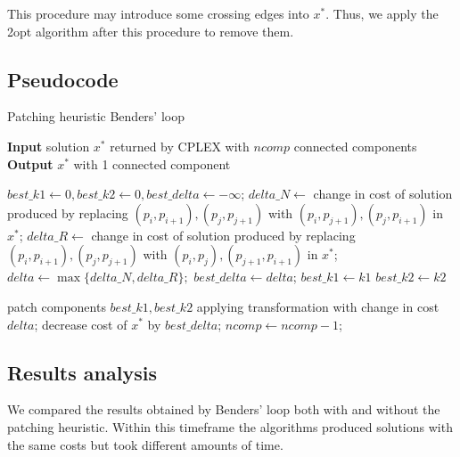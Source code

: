 This procedure may introduce some crossing edges into $x^*$. Thus, we apply the 2opt algorithm after this procedure to remove them.

\newpage
\subsection{Pseudocode}
\begin{algorithm}[h]
    \caption{Patching heuristic Benders' loop}
    \hspace*{\algorithmicindent} \textbf{Input} solution $x^*$ returned by CPLEX with $ncomp$ connected components\\
    \hspace*{\algorithmicindent} \textbf{Output} $x^*$ with 1 connected component\\
    \begin{algorithmic}

        \State $best\_k1\gets0, best\_k2\gets0, best\_delta\gets-\infty$;
        \State $delta\_N\gets$ change in cost of solution produced by replacing
        \State $(p_i,p_{i+1}), (p_j,p_{j+1})$ with $(p_i,p_{j+1}), (p_j,p_{i+1})$ in $x^*$;
        \State $delta\_R\gets$ change in cost of solution produced by replacing
        \State $(p_i,p_{i+1}), (p_j,p_{j+1})$ with $(p_i,p_j), (p_{j+1},p_{i+1})$ in $x^*$;
        \State $delta\gets\max\{delta\_N,delta\_R\};$
        \State $best\_delta \gets delta$;
        \State $best\_k1\gets k1$
        \State $best\_k2\gets k2$
        \EndIf
        \EndFor
        \EndFor

        \State patch components $best\_k1,best\_k2$ applying transformation with change in cost
        \State $delta$;
        \State decrease cost of $x^*$ by $best\_delta$;
        \State $ncomp \gets ncomp-1$;
        \EndWhile
    \end{algorithmic}
    
\end{algorithm}

\subsection{Results analysis}

We compared the results obtained by Benders' loop both with and without the patching heuristic. Within this timeframe the algorithms produced solutions with the same costs but took different amounts of time.

